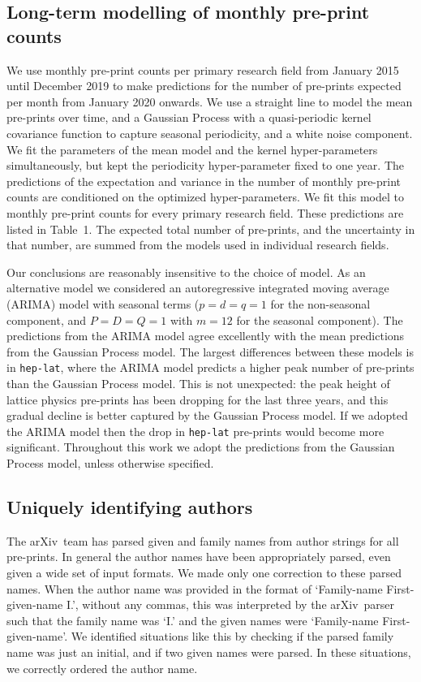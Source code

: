 \documentclass[]{rsos}%
\newcommand{\arxiv}{arXiv}
\begin{document}
\subsection*{Long-term modelling of monthly pre-print counts}

We use monthly pre-print counts per primary research field from January 2015 until December 2019 to make predictions for the number of pre-prints expected per month from January 2020 onwards. We use a straight line to model the mean pre-prints over time, and a Gaussian Process with a quasi-periodic kernel covariance function to capture seasonal periodicity\cite{Rasmussen:2006,Ambikasaran:2014}, and a white noise component. We fit the parameters of the mean model and the kernel hyper-parameters simultaneously, but kept the periodicity hyper-parameter fixed to one year. The predictions of the expectation and variance in the number of monthly pre-print counts are conditioned on the optimized hyper-parameters. We fit this model to monthly pre-print counts for every primary research field. These predictions are listed in Table~1. The expected total number of pre-prints, and the uncertainty in that number, are summed from the models used in individual research fields. 

Our conclusions are reasonably insensitive to the choice of model. As an alternative model we considered an autoregressive integrated moving average (ARIMA) model\cite{BoxJenkins:1970} with seasonal terms ($p=d=q=1$ for the non-seasonal component, and $P=D=Q=1$ with $m=12$ for the seasonal component). The predictions from the ARIMA model agree excellently with the mean predictions from the Gaussian Process model. The largest differences between these models is in \texttt{hep-lat}, where the ARIMA model predicts a higher peak number of pre-prints than the Gaussian Process model. This is not unexpected: the peak height of lattice physics pre-prints has been dropping for the last three years, and this gradual decline is better captured by the Gaussian Process model. If we adopted the ARIMA model then the drop in \texttt{hep-lat} pre-prints would become more significant. Throughout this work we adopt the predictions from the Gaussian Process model, unless otherwise specified.



\subsection*{Uniquely identifying authors}

The \arxiv\ team has parsed given and family names from author strings for all pre-prints. In general the author names have been appropriately parsed, even given a wide set of input formats. We made only one correction to these parsed names. When the author name was provided in the format of `Family-name First-given-name I.', without any commas, this was interpreted by the \arxiv\ parser such that the family name was `I.' and the given names were `Family-name First-given-name'. We identified situations like this by checking if the parsed family name was just an initial, and if two given names were parsed. In these situations, we correctly ordered the author name.
\end{document}
